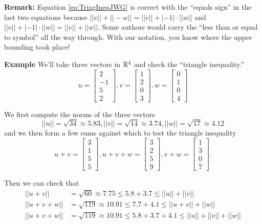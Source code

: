 \vspace*{0.2cm}

\textbf{Remark:} Equation \ref{eq:TriagIneqJWG} is correct with the ``equals sign'' in the last two equations because $||v|| + ||-w|| = ||v|| + |-1|\cdot ||w||$ and $||v|| + |-1|\cdot ||w|| = ||v|| + ||w||$. Some authors would carry the ``less than or equal to symbol'' all the way through. With our notation, you know where the upper bounding took place!

\vspace*{0.5cm}
\textbf{Example} We'll take three vectors in $\mathbb R^4$ and check the ``triangle inequality.'' 
$$ u=  \left[ \begin{array}{r} 2 \\ -1 \\ 5 \\ 2  \end{array} \right],  v=  \left[ \begin{array}{r} 1 \\ 2 \\ 0 \\ 3   \end{array} \right],  w=  \left[ \begin{array}{r} 0 \\ 1 \\ 0 \\4   \end{array} \right] $$

We first compute the norms of the three vectors
$$||u|| = \sqrt{34}\approx 5.83,  ||v|| = \sqrt{14} \approx 3.74, ||w||=\sqrt{17
} \approx 4.12$$
and we then form a few sums against which to test the triangle inequality
$$ u + v = \left[ \begin{array}{r} 3 \\ 1 \\ 5 \\ 5   \end{array} \right], u + v + w = \left[ \begin{array}{r} 3 \\ 2 \\ 5 \\ 9   \end{array} \right], v+w =   \left[ \begin{array}{r} 1 \\ 3 \\ 0\\ 7   \end{array} \right].$$

Then we can check that
\begin{align*}
    ||u+v|| &= \sqrt{60} \approx 7.75 \le  5.8 + 3.7 \le ||u|| + ||v|| \\
    ||u+v+w||&= \sqrt{119} \approx 10.91 \le 7.7 + 4.1 \le ||u+v|| + ||w|| \\
    ||u+v+w||&= \sqrt{119} \approx 10.91 \le 5.8 + 3.7 + 4.1 \le||u|| + ||v|| + ||w||
\end{align*}  


